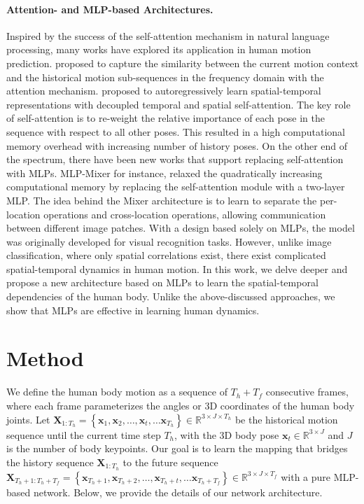 \documentclass{article}
\begin{document}
\paragraph{Attention- and MLP-based Architectures.}
Inspired by the success of the self-attention mechanism \cite{vaswani2017attention} in natural language processing, many works have explored its application in human motion prediction. \cite{mao2020history} proposed to capture the similarity between the current motion context and the historical motion sub-sequences in the frequency domain with the attention mechanism. \cite{aksan2020spatio} proposed to autoregressively learn spatial-temporal representations with  decoupled temporal and spatial self-attention. The key role of self-attention is to re-weight the relative importance of each pose in the sequence with respect to all other poses. This resulted in a high computational memory overhead with increasing number of history poses. On the other end of the spectrum, there have been new works that support replacing self-attention with MLPs. MLP-Mixer  \cite{tolstikhin2021mlp} for instance, relaxed the quadratically increasing computational memory by replacing the self-attention module with a two-layer MLP. The idea behind the Mixer architecture is to learn to separate the per-location operations and cross-location operations, allowing communication between different image patches. With a design based solely on MLPs, the model was originally developed for visual recognition tasks. However, unlike image classification, where only spatial correlations exist, there exist complicated spatial-temporal dynamics in human motion. In this work, we delve deeper and propose a new architecture based on MLPs to learn the spatial-temporal dependencies of the human body. Unlike the above-discussed approaches, we show that MLPs are effective in learning human dynamics. 

\section {Method}

We define the human body motion as a sequence of $T_h + T_f$ consecutive frames, where each frame parameterizes the angles or 3D coordinates of the human body joints. Let $\mathbf{X}_{1: T_h}=\left\{\mathbf{x}_{1}, \mathbf{x}_{2}, \ldots,\mathbf{x}_{t}, \ldots  \mathbf{x}_{T_h}\right\} \in \mathbb{R}^{3 \times J \times T_h}$ be the historical motion sequence until the current time step $T_h$, with the 3D body pose $\mathbf{x}_{t} \in \mathbb{R}^{3 \times J}$ and  $J$ is the number of body keypoints. Our goal is to learn the mapping that bridges the history sequence $\mathbf{X}_{1: T_h}$ to the future sequence  $\mathbf{X}_{T_h+1: T_h+T_f}=\left\{\mathbf{x}_{T_h+1}, \mathbf{x}_{T_h+2}, \ldots,\mathbf{x}_{T_h+t}, \ldots  \mathbf{x}_{T_h +T_f}\right\} \in \mathbb{R}^{3 \times J \times T_f}$ with a pure MLP-based network. Below, we provide the details of our network architecture.
\end{document}
